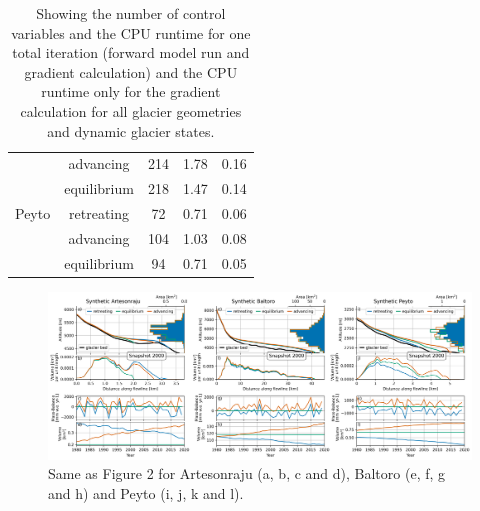 \documentclass[journal abbreviation, manuscript]{copernicus}
\begin{document}
\begin{table}[]
\begin{tabular}{ccccc}
                     & advancing     & 214                      & 1.78                                                                               & 0.16                                                                                        \\ \cline{2-5} 
                     & equilibrium   & 218                      & 1.47                                                                               & 0.14                                                                                        \\ \hline
Peyto                & retreating    & 72                       & 0.71                                                                               & 0.06                                                                                        \\ \cline{2-5} 
                     & advancing     & 104                      & 1.03                                                                               & 0.08                                                                                        \\ \cline{2-5} 
\multicolumn{1}{l}{} & equilibrium   & 94                       & 0.71                                                                               & 0.05                                                                                        \\ \hline
\end{tabular}
\caption{Showing the number of control variables and the CPU runtime for one total iteration (forward model run and gradient calculation) and the CPU runtime only for the gradient calculation for all glacier geometries and dynamic glacier states.}
\label{tab_sup:number_control_vars_cpu_runtime}
\end{table}

\begin{landscape}
\begin{figure}
    \centering
    \includegraphics[width=21cm]{supfig01.png}
    \caption{Same as Figure 2 for Artesonraju (a, b, c and d), Baltoro (e, f, g and h) and Peyto (i, j, k and l).}
    \label{fig_sup:geometry_creation_artesonraju_baltoro_peyto}
\end{figure}
\end{landscape}

\received{}
\pubdiscuss{} %
\revised{}
\accepted{}
\published{}


\clearpage

%
%
\end{document}

